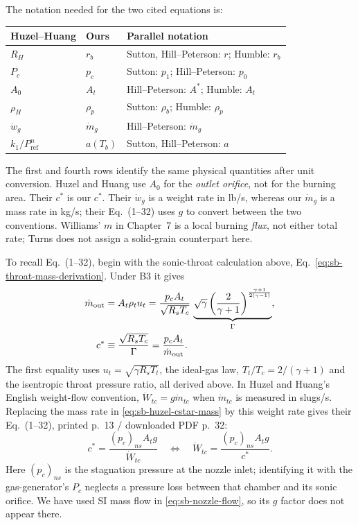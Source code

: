 The notation needed for the two cited equations is:
\begin{center}
\begin{tabular}{lll}
Huzel--Huang & Ours & Parallel notation\\ \hline
$R_H$ & $r_b$ & Sutton, Hill--Peterson: $r$; Humble: $r_b$\\
$P_c$ & $p_c$ & Sutton: $p_1$; Hill--Peterson: $p_0$\\
$A_0$ & $A_t$ & Hill--Peterson: $A^*$; Humble: $A_t$\\
$\rho_H$ & $\rho_p$ & Sutton: $\rho_b$; Humble: $\rho_p$\\
$\dot w_g$ & $\dot m_g$ & Hill--Peterson: $\dot m_g$\\
$k_1/P_{\mathrm{ref}}^n$ & $a(T_b)$ & Sutton, Hill--Peterson: $a$\\
\end{tabular}
\end{center}
The first and fourth rows identify the same physical quantities after
unit conversion. Huzel and Huang use $A_0$ for the \emph{outlet orifice},
not for the burning area. Their $c^*$ is our $c^*$. Their $\dot w_g$ is
a weight rate in lb/s, whereas our $\dot m_g$ is a mass rate in kg/s;
their Eq.~(1--32) uses $g$ to convert between the two conventions.
Williams' $m$ in Chapter~7 is a local burning \emph{flux}, not either
total rate; Turns does not assign a solid-grain counterpart here.

To recall Eq.~(1--32), begin with the sonic-throat calculation above,
Eq.~\eqref{eq:sb-throat-mass-derivation}. Under B3 it gives
\begin{align}
 \dot m_{\mathrm{out}}
 &=A_t\rho_tu_t
  =\frac{p_cA_t}{\sqrt{R_sT_c}}\,
    \underbrace{\sqrt{\gamma}
      \left(\frac{2}{\gamma+1}\right)^{
      \frac{\gamma+1}{2(\gamma-1)}}}_{\Gamma},
 \notag\\
 c^*&\equiv\frac{\sqrt{R_sT_c}}{\Gamma}
  =\frac{p_cA_t}{\dot m_{\mathrm{out}}}.
 \label{eq:sb-huzel-cstar-mass}
\end{align}
The first equality uses $u_t=\sqrt{\gamma R_sT_t}$, the ideal-gas law,
$T_t/T_c=2/(\gamma+1)$ and the isentropic throat pressure ratio, all
derived above. In Huzel and Huang's English weight-flow convention,
$\dot W_{tc}=g\dot m_{tc}$ when $\dot m_{tc}$ is measured in slugs/s.
Replacing the mass rate in \eqref{eq:sb-huzel-cstar-mass} by this weight
rate gives their Eq.~(1--32), printed p.~13 / downloaded PDF p.~32:
\begin{equation}\label{eq:sb-huzel-cstar-weight}
 c^*=\frac{(p_c)_{ns}A_tg}{\dot W_{tc}}
 \quad\Longleftrightarrow\quad
 \dot W_{tc}=\frac{(p_c)_{ns}A_tg}{c^*}.
\end{equation}
Here $(p_c)_{ns}$ is the stagnation pressure at the nozzle inlet;
identifying it with the gas-generator's $P_c$ neglects a pressure loss
between that chamber and its sonic orifice. We have used SI mass flow
in \eqref{eq:sb-nozzle-flow}, so its $g$ factor does not appear there.

